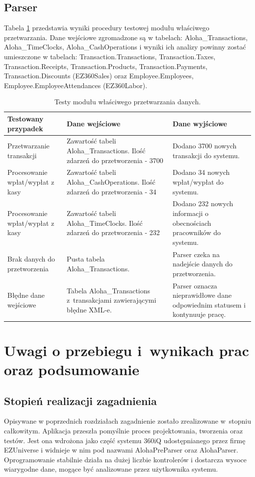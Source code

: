 \documentclass[a4paper]{book}
\begin{document}
\section {Parser}
Tabela \ref{tab:testy_parser} przedstawia wyniki procedury testowej modułu właściwego przetwarzania.
Dane wejściowe zgromadzone są w tabelach: Aloha\_Transactions, Aloha\_TimeClocks, Aloha\_CashOperations i wyniki ich analizy powinny zostać umieszczone w tabelach: Transaction.Transactions, Transaction.Taxes, Transaction.Receipts, Transaction.Products, Transaction.Payments, Transaction.Discounts (EZ360Sales) oraz Employee.Employees, Employee.EmployeeAttendances (EZ360Labor). 
\begin{table}
	\centering
	\caption{Testy modułu właściwego przetwarzania danych.}
	\begin{tabular}{|p{4cm}|p{4cm}|p{4cm}|}
		\hline
		Testowany przypadek & Dane wejściowe & Dane wyjściowe \\
		\hline
		Przetwarzanie transakcji & Zawartość tabeli Aloha\_Transactions. Ilość zdarzeń do przetworzenia - 3700  &  Dodano 3700 nowych transakcji do systemu.\\
		\hline
		Procesowanie wpłat/wypłat z kasy & Zawartość tabeli Aloha\_CashOperations. Ilość zdarzeń do przetworzenia - 34  &  Dodano 34 nowych wpłat/wypłat do systemu. \\
		\hline
		Procesowanie wpłat/wypłat z kasy & Zawartość tabeli Aloha\_TimeClocks. Ilość zdarzeń do przetworzenia - 232  &  Dodano 232 nowych informacji o obecnościach pracowników do systemu. \\
		\hline
		Brak danych do przetworzenia & Pusta tabela Aloha\_Transactions. & Parser czeka na nadejście danych do przetworzenia. \\
		\hline 
		Błędne dane wejściowe & Tabela Aloha\_Transactions z~transakcjami zawierającymi błędne XML-e. & Parser oznacza nieprawidłowe dane odpowiednim statusem i kontynuuje pracę. \\
		\hline 
	\end{tabular}
	\label{tab:testy_parser}
\end{table}
\chapter{Uwagi o przebiegu i~wynikach prac oraz podsumowanie}
\label{rozdzial7}
\section {Stopień realizacji zagadnienia}
Opisywane w poprzednich rozdziałach zagadnienie zostało zrealizowane w~stopniu całkowitym. Aplikacja przeszła pomyślnie proces projektowania, tworzenia oraz testów. Jest ona wdrożona jako część systemu 360iQ udostępnianego przez firmę EZUniverse i widnieje w nim pod nazwami AlohaPreParser oraz AlohaParser. Oprogramowanie stabilnie działa na dużej liczbie kontrolerów i dostarcza wysoce wiarygodne dane, mogące być analizowane przez użytkownika systemu.
\end{document}
